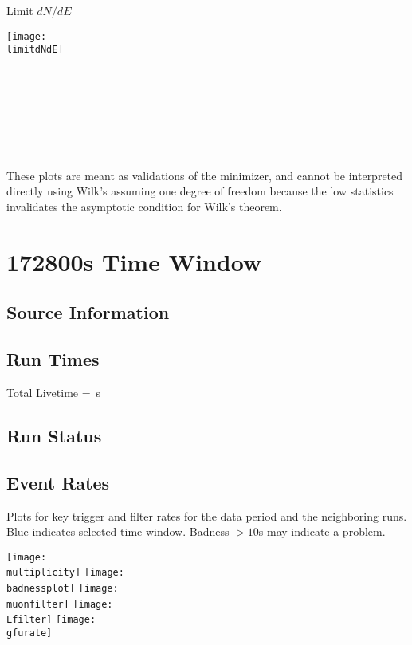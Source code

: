 \documentclass[titlepage]{article}
\begin{document}
\pagebreak
{
  \centering

  {\Large Limit $dN/dE$}

  \texttt{[image: \\limitdNdE]}
  \\
  \\

  \tsd

  \\
  \\
  \upperlim

  \\
  \\
  \nsscan

  These plots are meant as validations of the minimizer, and cannot be interpreted directly using Wilk's assuming one degree of freedom because the low statistics invalidates the asymptotic condition for Wilk's theorem.
}

\vfill

\pagebreak
\section{172800s Time Window}

\subsection{Source Information}
\sourcetable

\subsection{Run Times}
\runtimetable

Total Livetime = \livetime\,s

\subsection{Run Status}
\runstatustable

\pagebreak
\subsection{Event Rates}
Plots for key trigger and filter rates for the data period
and the neighboring runs.  Blue indicates selected time window.
Badness $>10$s may indicate a problem.

\vspace{1em}
{
 \centering
 \texttt{[image: \\multiplicity]}
 \texttt{[image: \\badnessplot]}
 \texttt{[image: \\muonfilter]}
 \texttt{[image: \\Lfilter]}
 \texttt{[image: \\gfurate]}
}
\end{document}
